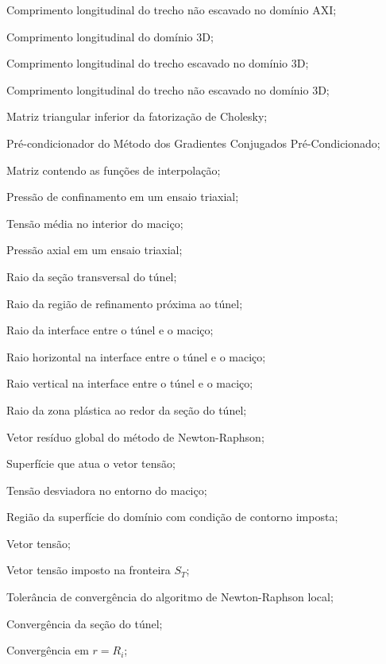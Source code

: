 \item[$L_{y_2}$]		Comprimento longitudinal do trecho não escavado no domínio AXI;
\item[$L_z$]			Comprimento longitudinal do domínio 3D;
\item[$L_{z_1}$]		Comprimento longitudinal do trecho escavado no domínio 3D;
\item[$L_{z_2}$]		Comprimento longitudinal do trecho não escavado no domínio 3D;
\item[$\Lll$]			Matriz triangular inferior da fatorização de Cholesky;
\item[$\Mll$]			Pré-condicionador do Método dos Gradientes Conjugados Pré-Condicionado;
\item[$\Nll$]			Matriz contendo as funções de interpolação;
\item[$ P $] 			Pressão de confinamento em um ensaio triaxial;
\item[$ P_0 $] 			Tensão média no interior do maciço;
\item[$ Q $] 			Pressão axial em um ensaio triaxial;
\item[$ R $]			Raio da seção transversal do túnel;
\item[$ R_1 $]			Raio da região de refinamento próxima ao túnel;
\item[$R_{i}$]			Raio da interface entre o túnel e o maciço;
\item[$R_{h_i}$]		Raio horizontal na interface entre o túnel e o maciço;
\item[$R_{v_i}$]		Raio vertical na interface entre o túnel e o maciço;
\item[$ R^p $]			Raio da zona plástica ao redor da seção do túnel;
\item[$\Rl_i$]			Vetor resíduo global do método de Newton-Raphson;
\item[$ S $] 			Superfície que atua o vetor tensão;
\item[$ S_0 $] 			Tensão desviadora no entorno do maciço;
\item[$ S_T $] 			Região da superfície do domínio com condição de contorno imposta;
\item[$ \Tl $] 			Vetor tensão;
\item[$ \Tl^d $] 		Vetor tensão imposto na fronteira $S_T$;
\item[$ TOL $] 			Tolerância de convergência do algoritmo de Newton-Raphson local;
\item[$ U $] 			Convergência da seção do túnel;
\item[$ U_i $] 			Convergência em $r = R_i$;
